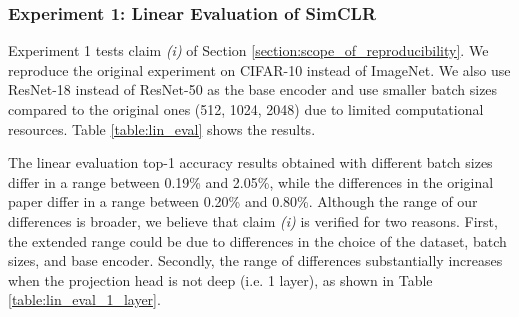     \subsubsection{Experiment 1: Linear Evaluation of SimCLR}
    \label{exp_1}

    Experiment 1 tests claim \textit{(i)} of Section \ref{section:scope_of_reproducibility}.
    We reproduce the original experiment on CIFAR-10 instead of ImageNet. We also use ResNet-18 instead of ResNet-50 as the base encoder and use smaller batch sizes compared to the original ones (512, 1024, 2048) due to limited computational resources.
    Table \ref{table:lin_eval} shows the results.
    
    
    


\begin{table}[H]
\centering
{}
\caption{Linear eval accuracy of ResNet-18 on CIFAR-10.}
\label{table:lin_eval}
\end{table}

The linear evaluation top-1 accuracy results obtained with different batch sizes differ in a range between 0.19\% and 2.05\%, while the differences in the original paper differ in a range between 0.20\% and 0.80\%. Although the range of our differences is broader, we believe that claim \textit{(i)} is verified for two reasons. First, the extended range could be due to differences in the choice of the dataset, batch sizes, and base encoder. Secondly, the range of differences substantially increases when the projection head is not deep (i.e. 1 layer), as shown in Table \ref{table:lin_eval_1_layer}.
     



